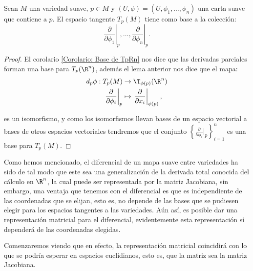 \begin{theorem}\label{Teorema: Base para el espacio tangente}
	Sean $M$ una variedad suave, $p \in M$ y $(U,\phi) = (U, \phi_1, \dots, \phi_n)$ una carta suave que contiene a $p$. El espacio tangente $T_p(M)$ tiene como base a la colección:
	\[
		\left. \frac{\partial}{\partial \phi_1} \right|_p, \hdots, \left. \frac{\partial}{\partial \phi_n} \right|_p .
	\]
\end{theorem}

\begin{proof}
	El corolario \ref{Corolario: Base de TpRn} nos dice que las derivadas parciales forman una base para $T_p(\R^n)$, además el lema anterior nos dice que el mapa:
	\begin{align*}
		d_p\phi: T_p(M)                                     & \to \T_{\phi(p)} (\R^n) \\
		\left. \frac{\partial}{\partial \phi_i} \right|_{p} & \mapsto
		\left. \frac{\partial}{\partial x_i} \right|_{\phi(p)},
	\end{align*}

	es un isomorfismo, y como los isomorfismos llevan bases de un espacio vectorial a bases de otros espacios vectoriales tendremos que el conjunto $\left\{ \frac{\partial}{\partial \phi_{i}}|_{p} \right\}_{i=1}^{n}$ es una base para $T_{p}(M)$.
\end{proof}

Como hemos mencionado, el diferencial de un mapa suave entre variedades ha sido de tal modo que este sea una generalización de la derivada total conocida del cálculo en $\R^n$, la cual puede ser representada por la matriz Jacobiana, sin embargo, una ventaja que tenemos con el diferencial es que es independiente de las coordenadas que se elijan, esto es, no depende de las bases que se pudiesen elegir para los espacios tangentes a las variedades. Aún así, es posible dar una representación matricial para el diferencial, evidentemente esta representación sí dependerá de las coordenadas elegidas.

Comenzaremos viendo que en efecto, la representación matricial coincidirá con lo que se podría esperar en espacios euclidianos, esto es, que la matriz sea la matriz Jacobiana.

